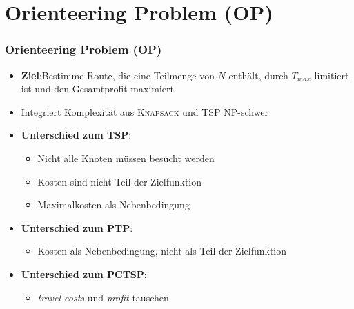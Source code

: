 \documentclass{beamer}
\begin{document}
\section{Orienteering Problem (\textsc{OP})}

\begin{frame}
\frametitle{Orienteering Problem (\textsc{OP})}
\begin{itemize}
  \item \textbf{Ziel}:\newline Bestimme Route, die eine Teilmenge von $N$ enthält, durch $T_{max}$ limitiert ist
  und den Gesamtprofit maximiert
  \item Integriert Komplexität aus \textsc{Knapsack} und \textsc{TSP} \textrightarrow NP-schwer
  \item \textbf{Unterschied zum \textsc{TSP}}:
  \begin{itemize}
    \item Nicht alle Knoten müssen besucht werden
    \item Kosten sind nicht Teil der Zielfunktion
    \item Maximalkosten als Nebenbedingung
  \end{itemize}
  \item \textbf{Unterschied zum \textsc{PTP}}:
  \begin{itemize}
    \item Kosten als Nebenbedingung, nicht als Teil der Zielfunktion
  \end{itemize}
  \item \textbf{Unterschied zum \textsc{PCTSP}}:
  \begin{itemize}
    \item \textit{travel costs} und \textit{profit} tauschen 
  \end{itemize}
\end{itemize}
\end{frame}
\end{document}
